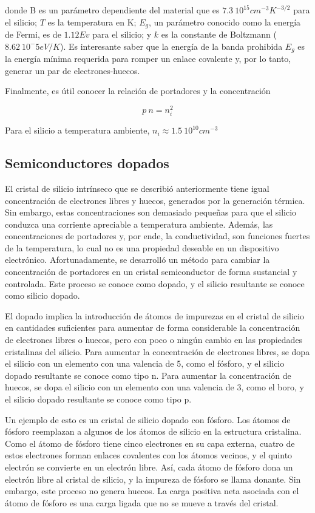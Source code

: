 donde B es un parámetro dependiente del material que es $7.3 \ 10^15 cm^{-3}K^{-3/2}$ para el silicio; $T$ es la temperatura en K; $E_g$, un parámetro conocido como la energía de Fermi, es de $1.12 Ev$ para el silicio; y $k$ es la constante de Boltzmann ($8.62 \ 10^-5 eV/K$). 
Es interesante saber que la energía de la banda prohibida $E_g$ es la energía mínima requerida para romper un enlace covalente y, por lo tanto, generar un par de electrones-huecos.

Finalmente, es útil conocer la relación de portadores y la concentración 

\begin{equation*}
p \ n = n_i^2 
\end{equation*}

Para el silicio a temperatura ambiente, $n_i \approx 1.5 \ 10^{10} cm^{-3}$


\subsection{Semiconductores dopados}

El cristal de silicio intrínseco que se describió anteriormente tiene igual concentración de electrones libres y huecos, generados por la generación térmica. Sin embargo, estas concentraciones son demasiado pequeñas para que el silicio conduzca una corriente apreciable a temperatura ambiente. Además, las concentraciones de portadores y, por ende, la conductividad, son funciones fuertes de la temperatura, lo cual no es una propiedad deseable en un dispositivo electrónico. Afortunadamente, se desarrolló un método para cambiar la concentración de portadores en un cristal semiconductor de forma sustancial y controlada. Este proceso se conoce como dopado, y el silicio resultante se conoce como silicio dopado.

El dopado implica la introducción de átomos de impurezas en el cristal de silicio en cantidades suficientes para aumentar de forma considerable la concentración de electrones libres o huecos, pero con poco o ningún cambio en las propiedades cristalinas del silicio. Para aumentar la concentración de electrones libres, se dopa el silicio con un elemento con una valencia de 5, como el fósforo, y el silicio dopado resultante se conoce como tipo n. Para aumentar la concentración de huecos, se dopa el silicio con un elemento con una valencia de 3, como el boro, y el silicio dopado resultante se conoce como tipo p.

Un ejemplo de esto es un cristal de silicio dopado con fósforo. Los átomos de fósforo reemplazan a algunos de los átomos de silicio en la estructura cristalina. Como el átomo de fósforo tiene cinco electrones en su capa externa, cuatro de estos electrones forman enlaces covalentes con los átomos vecinos, y el quinto electrón se convierte en un electrón libre. Así, cada átomo de fósforo dona un electrón libre al cristal de silicio, y la impureza de fósforo se llama donante. Sin embargo, este proceso no genera huecos. La carga positiva neta asociada con el átomo de fósforo es una carga ligada que no se mueve a través del cristal.

